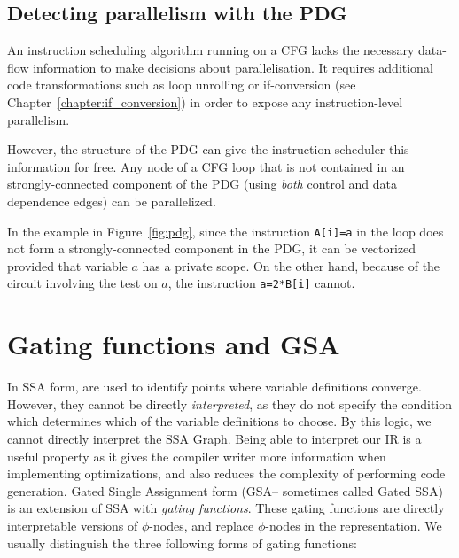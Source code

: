 \subsection{Detecting parallelism with the PDG}

An instruction scheduling algorithm running on a CFG lacks the necessary data-flow information to make decisions about parallelisation. It requires additional code transformations such as loop unrolling or if-conversion (see Chapter~\ref{chapter:if_conversion}) in order to expose any instruction-level parallelism.

However, the structure of the PDG can give the instruction scheduler this information for free. Any node of a CFG loop that is not contained in an strongly-connected component of the PDG (using \textit{both} control and data dependence edges) can be parallelized. 

In the example in Figure~\ref{fig:pdg}, since the instruction \texttt{A[i]=a} in the loop does not form a strongly-connected component in the PDG, it can be vectorized provided that variable $a$ has a private scope. 
On the other hand, because of the circuit involving the test on $a$, the instruction \texttt{a=2*B[i]} cannot.


\section{Gating functions and GSA}
\label{sec:gating_functions}
In SSA form, \phifuns are used to identify points where variable definitions converge. 
However, they cannot be directly \textit{interpreted}, as they do not specify the condition which determines which of the variable definitions to choose. 
By this logic, we cannot directly interpret the SSA Graph. 
Being able to interpret our IR is a useful property as it gives the compiler writer more information when implementing optimizations, and also reduces the complexity of performing code generation. 
Gated Single Assignment form (GSA-- sometimes called Gated SSA) is an extension of SSA with \textit{gating functions}. 
These gating functions are directly interpretable versions of $\phi$-nodes, and replace $\phi$-nodes in the representation. 
We usually distinguish the three following forms of gating functions:

